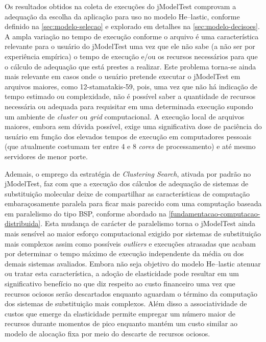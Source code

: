 \documentclass[english,brazilian]{UNISINOSmonografia} %
\begin{document}
Os resultados obtidos na coleta de execuções do jModelTest comprovam a adequação da escolha da aplicação para uso no modelo \textsf{He}--lastic, conforme definido na \autoref{sec:modelo-selecao} e explorado em detalhes na \autoref{sec:modelo-decisoes}.
%
A ampla variação no tempo de execução conforme o arquivo é uma característica relevante para o usuário do jModelTest uma vez que ele não sabe (a não ser por experiência empírica) o tempo de execução e/ou os recursos necessários para que o cálculo de adequação que está prestes a realizar.
%
Este problema torna-se ainda mais relevante em casos onde o usuário pretende executar o jModelTest em arquivos maiores, como 12-stamatakis-59, pois, uma vez que não há indicação de tempo estimado ou complexidade, não é possível saber a quantidade de recursos necessária ou adequada para requisitar em uma determinada execução supondo um ambiente de \textit{cluster} ou \textit{grid} computacional.
%
A execução local de arquivos maiores, embora sem dúvida possível, exige uma significativa dose de paciência do usuário em função dos elevados tempos de execução em computadores pessoais (que atualmente costumam ter entre 4 e 8 \textit{cores} de processamento) e até mesmo servidores de menor porte.



Ademais, o emprego da estratégia de \textit{Clustering Search}, ativada por padrão no jModelTest, faz com que a execução dos cálculos de adequação de sistemas de substituição molecular deixe de compartilhar as características de computação embaraçosamente paralela para ficar mais parecido com uma computação baseada em paralelismo do tipo BSP, conforme abordado na \autoref{fundamentacao-computacao-distribuida}.
%
Esta mudança de carácter de paralelismo torna o jModelTest ainda mais sensível ao maior esforço computacional exigido por sistemas de substituição mais complexos assim como possíveis \textit{outliers} e execuções atrasadas que acabam por determinar o tempo máximo de execução independente da média ou dos demais sistemas avaliados.
%
Embora não seja objetivo do modelo \textsf{He}--lastic atenuar ou tratar esta característica, a adoção de elasticidade pode resultar em um significativo benefício no que diz respeito ao custo financeiro uma vez que recursos ociosos serão descartados enquanto aguardam o término da computação dos sistemas de substituição mais complexos.
%
Além disso a associatividade de custos que emerge da elasticidade permite empregar um número maior de recursos durante momentos de pico enquanto mantém um custo similar ao modelo de alocação fixa por meio do descarte de recursos ociosos.
\end{document}
